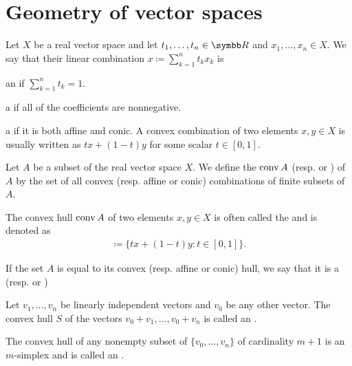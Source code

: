 \section{Geometry of vector spaces}\label{sec:geometry_of_vector_spaces}

\begin{definition}\label{def:real_linear_combinations}
  Let \( X \) be a real vector space and let \( t_1, \ldots, t_n \in \BB{R} \) and \( x_1, \ldots, x_n \in X \). We say that their linear combination \( x \coloneqq \sum_{k=1}^n t_k x_k \) is

  \begin{defenum}
    \item\label{def:real_linear_combinations/affine} an  if \( \sum_{k=1}^n t_k = 1 \).
    \item\label{def:real_linear_combinations/conic} a  if all of the coefficients are nonnegative.
    \item\label{def:real_linear_combinations/convex} a  if it is both affine and conic. A convex combination of two elements \( x, y \in X \) is usually written as \( tx + (1-t)y \) for some scalar \( t \in [0, 1] \).
  \end{defenum}
\end{definition}

\begin{definition}\label{def:linear_combination_hulls}
  Let \( A \) be a subset of the real vector space \( X \). We define the  \( \operatorname{conv} A \) (resp.  or ) of \( A \) by the set of all convex (resp. affine or conic) combinations of finite subsets of \( A \).

  The convex hull \( \operatorname{conv} A \) of two elements \( x, y \in X \) is often called the  and is denoted as
  \begin{align*}
    [x, y] \coloneqq \{ tx + (1-t)y \colon t \in [0, 1] \}.
  \end{align*}

  If the set \( A \) is equal to its convex (resp. affine or conic) hull, we say that it is a  (resp.  or )
\end{definition}

\begin{definition}\label{def:simplex}
  Let \( v_1, \ldots, v_n \) be linearly independent vectors and \( v_0 \) be any other vector. The convex hull \( S \) of the vectors \( v_0 + v_1, \ldots, v_0 + v_n \) is called an .

  The convex hull of any nonempty subset of \( \{ v_0, \ldots, v_n \} \) of cardinality \( m + 1 \) is an \( m \)-simplex and is called an .
\end{definition}
